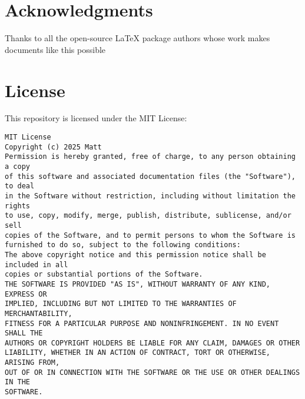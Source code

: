 \documentclass[nonacm, sigconf, balance=true]{acmart}
\begin{document}
    \section*{Acknowledgments}
    Thanks to all the open-source LaTeX package authors whose work makes documents like this possible

    \section*{License}
    This repository is licensed under the MIT License:
    \begin{verbatim}
MIT License
Copyright (c) 2025 Matt
Permission is hereby granted, free of charge, to any person obtaining a copy
of this software and associated documentation files (the "Software"), to deal
in the Software without restriction, including without limitation the rights
to use, copy, modify, merge, publish, distribute, sublicense, and/or sell
copies of the Software, and to permit persons to whom the Software is
furnished to do so, subject to the following conditions:
The above copyright notice and this permission notice shall be included in all
copies or substantial portions of the Software.
THE SOFTWARE IS PROVIDED "AS IS", WITHOUT WARRANTY OF ANY KIND, EXPRESS OR
IMPLIED, INCLUDING BUT NOT LIMITED TO THE WARRANTIES OF MERCHANTABILITY,
FITNESS FOR A PARTICULAR PURPOSE AND NONINFRINGEMENT. IN NO EVENT SHALL THE
AUTHORS OR COPYRIGHT HOLDERS BE LIABLE FOR ANY CLAIM, DAMAGES OR OTHER
LIABILITY, WHETHER IN AN ACTION OF CONTRACT, TORT OR OTHERWISE, ARISING FROM,
OUT OF OR IN CONNECTION WITH THE SOFTWARE OR THE USE OR OTHER DEALINGS IN THE
SOFTWARE.
    \end{verbatim}
\end{document}
